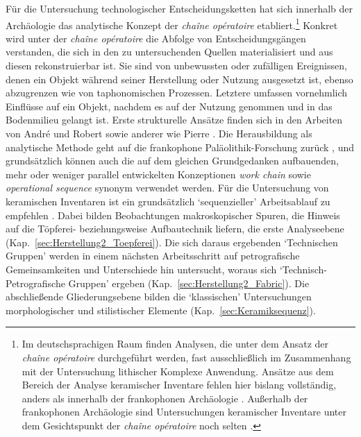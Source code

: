 Für die Untersuchung technologischer Entscheidungsketten hat sich innerhalb der Archäologie das analytische Konzept der \textit{\mbox{chaîne} opératoire} etabliert.\footnote{Im deutschsprachigen Raum finden Analysen, die unter dem Ansatz der \textit{chaîne opératoire} durchgeführt werden, fast ausschließlich im Zusammenhang mit der Untersuchung lithischer Komplexe Anwendung. Ansätze aus dem Bereich der Analyse keramischer Inventare fehlen hier bislang vollständig, anders als innerhalb der frankophonen Archäologie \parencites[siehe][]{Gosselain.1992}{Huysecom.1994}{PeuramakiBrown.2004}{Visseyrais.2006}{Manem.2008}{Mayor.2011b}{Roux.2011}{Ard.2014}{Gomart.2014}. Außerhalb der frankophonen Archäologie sind Untersuchungen keramischer Inventare unter dem Gesichtspunkt der \textit{chaîne opératoire} noch selten \parencites[siehe][]{vanderLeeuw.1993}{PeuramakiBrown.2004}{Berg.2007}{Berg.2011}{Berg.2017}{DeLaFuente.2011}.} Konkret wird unter der \textit{chaîne opératoire} die Abfolge von Entscheidungsgängen verstanden, die sich in den zu untersuchenden Quellen materialisiert und aus diesen rekonstruierbar ist. Sie sind von unbewussten oder zufälligen Ereignissen, denen ein Objekt während seiner Herstellung oder Nutzung ausgesetzt ist, ebenso abzugrenzen wie von taphonomischen Prozessen. Letztere umfassen vornehmlich Einflüsse auf ein Objekt, nachdem es auf der Nutzung genommen und in das Bodenmilieu gelangt ist. Erste strukturelle Ansätze finden sich in den Arbeiten von André \textcites{LeroiGourhan.1964}{LeroiGourhan.1965} und Robert \textcites{Cresswell.1983}{Cresswell.1993} sowie anderer wie Pierre \textcites{Lemonnier.1992}{Lemonnier.2002}. Die Herausbildung als analytische Methode geht auf die frankophone Paläolithik-Forschung zurück \parencites[nach][]{Audouze.2002}[104f.]{BarYosef.2009}, und grundsätzlich können auch die auf dem gleichen Grundgedanken aufbauenden, mehr oder weniger parallel entwickelten Konzeptionen \textit{work chain} \parencite{Cresswell.1990} sowie \textit{operational sequence} \parencites {Perles.1992}{Dibble.1995}{Chazan.2003}[nach][105]{BarYosef.2009} synonym verwendet werden. Für die Untersuchung von keramischen Inventaren ist ein grundsätzlich \enquote*{sequenzieller} Arbeitsablauf zu empfehlen \parencites[Abb.~\ref{fig:KeramikherstellungAnalysestrategienFrankophon}; siehe][25; 26 Abb.~4]{Ard.2014}[nach][]{Roux.2007}{Roux.2010}. Dabei bilden Beobachtungen makroskopischer Spuren, die Hinweis auf die Töpferei- beziehungsweise Aufbautechnik liefern, die erste Analyseebene (Kap.~\ref{sec:Herstellung2_Toepferei}). Die sich daraus ergebenden \enquote*{Technischen Gruppen} werden in einem nächsten Arbeitsschritt auf petrografische Gemeinsamkeiten und Unterschiede hin untersucht, woraus sich \enquote*{Technisch-Petrografische Gruppen} ergeben (Kap.~\ref{sec:Herstellung2_Fabric}). Die abschließende Gliederungsebene bilden die \enquote*{klassischen} Untersuchungen morphologischer und stilistischer Elemente (Kap.~\ref{sec:Keramiksequenz}).


